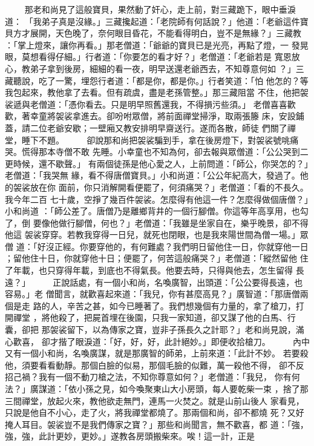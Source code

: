 \begin{pinyinscope}
{　　
那老和尚見了這般寶貝，果然動了奸心，走上前，對三藏跪下，眼中垂淚道：
「我弟子真是沒緣。」三藏攙起道：「老院師有何話說？」他道：「老爺這件寶
貝方才展開，天色晚了，奈何眼目昏花，不能看得明白，豈不是無緣？」三藏教
：「掌上燈來，讓你再看。」那老僧道：「爺爺的寶貝已是光亮，再點了燈，一
發晃眼，莫想看得仔細。」行者道：「你要怎的看才好？」老僧道：「老爺若是
寬恩放心，教弟子拿到後房，細細的看一夜，明早送還老爺西去，不知尊意何如
？」三藏聽說，吃了一驚，埋怨行者道：「都是你，都是你。」行者笑道：「怕
他怎的？等我包起來，教他拿了去看。但有疏虞，盡是老孫管整。」那三藏阻當
不住，他把袈裟遞與老僧道：「憑你看去。只是明早照舊還我，不得損污些須。」
老僧喜喜歡歡，著幸童將袈裟拿進去。卻吩咐眾僧，將前面禪堂掃淨，取兩張籐
床，安設鋪蓋，請二位老爺安歇；一壁廂又教安排明早齋送行。遂而各散，師徒
們關了禪堂，睡下不題。
　　
卻說那和尚把袈裟騙到手，拿在後房燈下，對袈裟號咷痛哭。慌得那本寺僧不敢
先睡。小幸童也不知為何，卻去報與眾僧道：「公公哭到二更時候，還不歇聲。」
有兩個徒孫是他心愛之人，上前問道：「師公，你哭怎的？」老僧道：「我哭無
緣，看不得唐僧寶貝。」小和尚道：「公公年紀高大，發過了。他的袈裟放在你
面前，你只消解開看便罷了，何須痛哭？」老僧道：「看的不長久。我今年二百
七十歲，空掙了幾百件袈裟。怎麼得有他這一件？怎麼得做個唐僧？」小和尚道
：「師公差了。唐僧乃是離鄉背井的一個行腳僧。你這等年高享用，也勾了，倒
要像他做行腳僧，何也？」老僧道：「我雖是坐家自在，樂乎晚景，卻不得他這
袈裟穿穿。若教我穿得一日兒，就死也閉眼，也是我來陽世間為僧一場。」眾僧
道：「好沒正經。你要穿他的，有何難處？我們明日留他住一日，你就穿他一日
；留他住十日，你就穿他十日；便罷了，何苦這般痛哭？」老僧道：「縱然留他
住了年載，也只穿得年載，到底也不得氣長。他要去時，只得與他去，怎生留得
長遠？」
　　
正說話處，有一個小和尚，名喚廣智，出頭道：「公公要得長遠，也容易。」老
僧聞言，就歡喜起來道：「我兒，你有甚麼高見？」廣智道：「那唐僧兩個是走
路的人，辛苦之甚，如今已睡著了。我們想幾個有力量的，拿了槍刀，打開禪堂
，將他殺了，把屍首埋在後園，只我一家知道，卻又謀了他的白馬、行囊，卻把
那袈裟留下，以為傳家之寶，豈非子孫長久之計耶？」老和尚見說，滿心歡喜，
卻才揩了眼淚道：「好，好，好，此計絕妙。」即便收拾槍刀。
　　
內中又有一個小和尚，名喚廣謀，就是那廣智的師弟，上前來道：「此計不妙。
若要殺他，須要看看動靜。那個白臉的似易，那個毛臉的似難，萬一殺他不得，
卻不反招己禍？我有一個不動刀槍之法，不知你尊意如何？」老僧道：「我兒，
你有何法？」廣謀道：「依小孫之見，如今喚聚東山大小房頭，每人要乾柴一束
，捨了那三間禪堂，放起火來，教他欲走無門，連馬一火焚之。就是山前山後人
家看見，只說是他自不小心，走了火，將我禪堂都燒了。那兩個和尚，卻不都燒
死？又好掩人耳目。袈裟豈不是我們傳家之寶？」那些和尚聞言，無不歡喜，都
道：「強，強，強，此計更妙，更妙。」遂教各房頭搬柴來。唉！這一計，正是
}
\end{pinyinscope}
